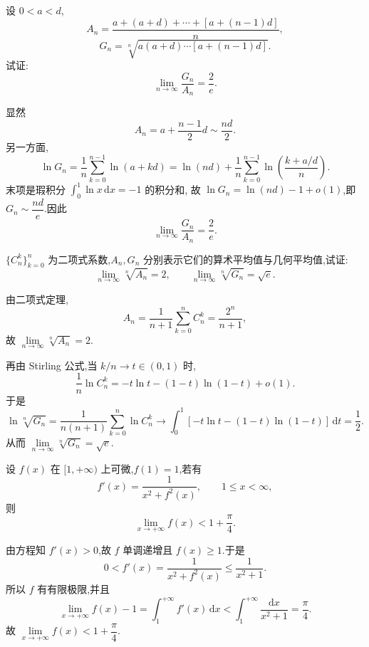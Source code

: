 \begin{example}
  设 $0<a<d$,
  \[
    A_n=\dfrac{a+(a+d)+\cdots+[a+(n-1)d]}{n},
  \]
  \[
    G_n=\sqrt[n]{a(a+d)\cdots[a+(n-1)d]}.
  \]
  试证:
  \[
    \displaystyle\lim\limits_{n\to\infty}\dfrac{G_n}{A_n}=\dfrac{2}{e}.
  \]
\end{example}
\exampleblank

\begin{solution}
  显然
  \[
    A_n=a+\dfrac{n-1}{2}d\sim\dfrac{nd}{2}.
  \]
  另一方面,
  \[
    \ln G_n=\dfrac{1}{n}\sum\limits_{k=0}^{n-1}\ln(a+kd)
    =\ln(nd)+\dfrac{1}{n}\sum\limits_{k=0}^{n-1}
    \ln\left(\dfrac{k+a/d}{n}\right).
  \]
  末项是瑕积分 $\displaystyle\int_0^1\ln x\,\mathrm{d}x=-1$ 的积分和,
  故 $\ln G_n=\ln(nd)-1+o(1)$,即 $G_n\sim\dfrac{nd}{e}$.因此
  \[
    \displaystyle\lim\limits_{n\to\infty}\dfrac{G_n}{A_n}=\dfrac{2}{e}.
  \]
\end{solution}

\begin{example}
  $\{C_{n}^{k}\}_{k=0}^n$ 为二项式系数,$A_n,G_n$ 分别表示它们的算术平均值与几何平均值,试证:
  \[
    \displaystyle\lim\limits_{n\to\infty}\sqrt[n]{A_n}=2,
    \qquad
    \lim\limits_{n\to\infty}\sqrt[n]{G_n}=\sqrt{e}.
  \]
\end{example}
\exampleblank

\begin{solution}
  由二项式定理,
  \[
    A_n=\dfrac{1}{n+1}\sum\limits_{k=0}^nC_n^k=\dfrac{2^n}{n+1},
  \]
  故 $\displaystyle\lim\limits_{n\to\infty}\sqrt[n]{A_n}=2$.

  再由 Stirling 公式,当 $k/n\to t\in(0,1)$ 时,
  \[
    \dfrac{1}{n}\ln C_n^k
    =-t\ln t-(1-t)\ln(1-t)+o(1).
  \]
  于是
  \[
    \ln\sqrt[n]{G_n}
    =\dfrac{1}{n(n+1)}\sum\limits_{k=0}^n\ln C_n^k
    \longrightarrow\int_0^1[-t\ln t-(1-t)\ln(1-t)]\,\mathrm{d}t
    =\dfrac{1}{2}.
  \]
  从而 $\displaystyle\lim\limits_{n\to\infty}\sqrt[n]{G_n}=\sqrt e$.
\end{solution}

\begin{example}
  设 $f(x)$ 在 $\lbrack 1,+\infty)$ 上可微,$f(1)=1$,若有
  \[
    f'(x)=\dfrac{1}{x^2+f^2(x)},
    \qquad 1\leq x<\infty,
  \]
  则
  \[
    \displaystyle\lim\limits_{x\to+\infty}f(x)<1+\dfrac{\pi}{4}.
  \]
\end{example}
\exampleblank

\begin{solution}
  由方程知 $f'(x)>0$,故 $f$ 单调递增且 $f(x)\geq1$.于是
  \[
    0<f'(x)=\dfrac{1}{x^2+f^2(x)}\leq\dfrac{1}{x^2+1}.
  \]
  所以 $f$ 有有限极限,并且
  \[
    \displaystyle\lim\limits_{x\to+\infty}f(x)-1
    =\int_1^{+\infty}f'(x)\,\mathrm{d}x
    <\int_1^{+\infty}\dfrac{\mathrm{d}x}{x^2+1}
    =\dfrac{\pi}{4}.
  \]
  故 $\displaystyle\lim\limits_{x\to+\infty}f(x)<1+\dfrac{\pi}{4}$.
\end{solution}


